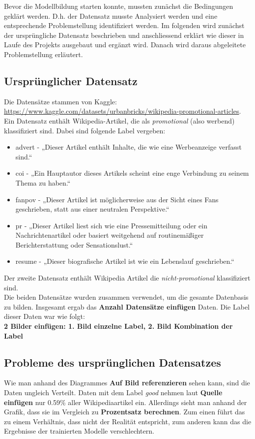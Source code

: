 
Bevor die Modellbildung starten konnte, mussten zunächst die Bedingungen geklärt werden. D.h. der Datensatz musste Analysiert werden und eine entsprechende Problemstellung identifiziert werden. Im folgenden wird zunächst der ursprüngliche Datensatz beschrieben und anschliessend erklärt wie dieser in Laufe des Projekts ausgebaut und ergänzt wird. Danach wird daraus abgeleitete Problemstellung erläutert.

\subsection{Ursprünglicher Datensatz}
Die Datensätze stammen von Kaggle: \url{https://www.kaggle.com/datasets/urbanbricks/wikipedia-promotional-articles}. Ein Datensatz enthält Wikipedia-Artikel, die als \emph{promotional} (also werbend) klassifiziert sind. Dabei sind folgende Label vergeben:
\begin{itemize}
    \item advert - „Dieser Artikel enthält Inhalte, die wie eine Werbeanzeige verfasst sind.“
    \item coi - „Ein Hauptautor dieses Artikels scheint eine enge Verbindung zu seinem Thema zu haben.“
    \item fanpov - „Dieser Artikel ist möglicherweise aus der Sicht eines Fans geschrieben, statt aus einer neutralen Perspektive.“
    \item pr - „Dieser Artikel liest sich wie eine Pressemitteilung oder ein Nachrichtenartikel oder basiert weitgehend auf routinemäßiger Berichterstattung oder Sensationslust.“
    \item resume - „Dieser biografische Artikel ist wie ein Lebenslauf geschrieben.“
\end{itemize}
Der zweite Datensatz enthält Wikipedia Artikel die \emph{nicht-promotional} klassifiziert sind. \\
Die beiden Datensätze wurden zusammen verwendet, um die gesamte Datenbasis zu bilden. Insgesamt ergab das \textbf{Anzahl Datensätze einfügen} Daten. Die Label dieser Daten war wie folgt: \\
\textbf{2 Bilder einfügen: 1. Bild einzelne Label, 2. Bild Kombination der Label}


\subsection{Probleme des ursprünglichen Datensatzes}
Wie man anhand des Diagrammes \textbf{Auf Bild referenzieren} sehen kann, sind die Daten ungleich Verteilt. Daten mit dem Label \textit{good} nehmen laut \textbf{Quelle einfügen} nur 0.59\% aller Wikipediaartikel ein. Allerdings sieht man anhand der Grafik, dass sie im Vergleich zu \textbf{Prozentsatz berechnen}. Zum einen führt das zu einem Verhältnis, dass nicht der Realität entspricht, zum anderen kann das die Ergebnisse der trainierten Modelle verschlechtern.



